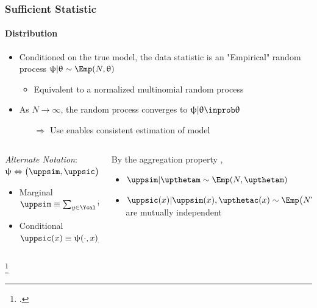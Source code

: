 \documentclass[aspectratio=169]{beamer}
\begin{document}
\begin{frame}
\frametitle{Sufficient Statistic}
\framesubtitle{Distribution}

\begin{itemize}
\item Conditioned on the true model, the data statistic is an "Empirical" random process $\uppsi | \uptheta \sim \Emp(N,\uptheta)$
\begin{itemize}
\item Equivalent to a normalized multinomial random process 
\end{itemize}
\item As $N \to \infty$, the random process converges to $\uppsi | \uptheta \inprob \uptheta$
\begin{itemize}
\item [$\Rightarrow$] Use enables \alert{consistent} estimation of model
\end{itemize}

\end{itemize}



\hrulefill
\vspace{.5em}

\begin{columns}[c]

\begin{column}{.5\linewidth}
\textit{Alternate Notation}: $\uppsi \Leftrightarrow \big( \uppsim,\uppsic \big)$
\begin{itemize}
\item Marginal $\uppsim \equiv \sum_{y \in \Ycal} \uppsi(y,\cdot)$
\item Conditional $\uppsic(x) \equiv \uppsi(\cdot,x) / \uppsim(x)$
\end{itemize}
\end{column}

\begin{column}{.5\linewidth}
By the aggregation property \footnotemark,
\begin{itemize}
\item $\uppsim | \upthetam \sim \Emp(N,\upthetam)$
\item $\uppsic(x) | \uppsim(x),\upthetac(x) \sim \Emp\big( N \uppsim(x),\upthetac(x) \big)$ are mutually \alert{independent}
\end{itemize}
\end{column}

\end{columns}

\footcitetext{johnson}

\end{frame}
\end{document}
